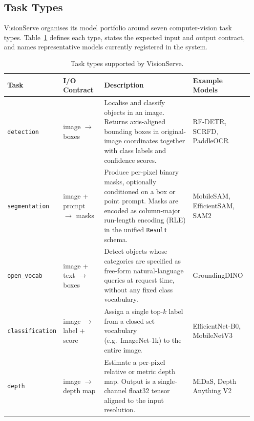 
\subsection{Task Types}
\label{sec:catalog:tasks}

VisionServe organises its model portfolio around seven computer-vision task types.
Table~\ref{tab:task-types} defines each type, states the expected input and output
contract, and names representative models currently registered in the system.

\begin{table}[t]
  \centering
  \small
  \caption{Task types supported by VisionServe.}
  \label{tab:task-types}
  \begin{tabular}{llp{6.2cm}l}
    \toprule
    \textbf{Task} & \textbf{I/O Contract} & \textbf{Description} & \textbf{Example Models} \\
    \midrule
    \texttt{detection}     & image $\to$ boxes     &
      Localise and classify objects in an image.
      Returns axis-aligned bounding boxes in original-image coordinates
      together with class labels and confidence scores.
      &
      RF-DETR, SCRFD, PaddleOCR \\[4pt]

    \texttt{segmentation}  & image + prompt $\to$ masks &
      Produce per-pixel binary masks, optionally conditioned on a box or
      point prompt.  Masks are encoded as column-major run-length encoding
      (RLE) in the unified \texttt{Result} schema.
      &
      MobileSAM, EfficientSAM, SAM2 \\[4pt]

    \texttt{open\_vocab}   & image + text $\to$ boxes &
      Detect objects whose categories are specified as free-form natural-language
      queries at request time, without any fixed class vocabulary.
      &
      GroundingDINO \\[4pt]

    \texttt{classification}& image $\to$ label + score &
      Assign a single top-\(k\) label from a closed-set vocabulary
      (e.g.\ ImageNet-1k) to the entire image.
      &
      EfficientNet-B0, MobileNetV3 \\[4pt]

    \texttt{depth}         & image $\to$ depth map &
      Estimate a per-pixel relative or metric depth map.  Output is a
      single-channel float32 tensor aligned to the input resolution.
      &
      MiDaS, Depth Anything V2 \\[4pt]


\end{tabular}
\end{table}
